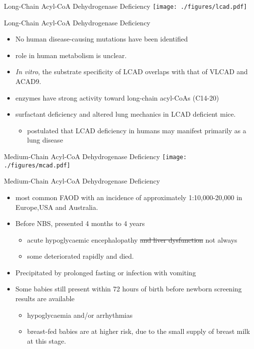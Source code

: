 \documentclass[presentation, smaller]{beamer}
\begin{document}
\begin{frame}[label={sec:orgheadline22}]{Long-Chain Acyl-CoA Dehydrogenase Deficiency}
\texttt{[image: ./figures/lcad.pdf]}
\end{frame}
\begin{frame}[label={sec:orgheadline23}]{Long-Chain Acyl-CoA Dehydrogenase Deficiency}
\begin{itemize}
\item No human disease-causing mutations have been identified
\item role  in  human  metabolism  is unclear.
\item \emph{In vitro}, the substrate specificity of LCAD overlaps with that of
VLCAD and ACAD9.
\item enzymes have strong activity toward long-chain acyl-CoAs (C14-20)
\item surfactant deficiency and altered lung mechanics in LCAD deficient
mice.
\begin{itemize}
\item postulated that LCAD deficiency in humans may manifest primarily
as a lung disease
\end{itemize}
\end{itemize}
\end{frame}
\begin{frame}[label={sec:orgheadline24}]{Medium-Chain Acyl-CoA Dehydrogenase Deficiency}
\texttt{[image: ./figures/mcad.pdf]}
\end{frame}
\begin{frame}[label={sec:orgheadline25}]{Medium-Chain Acyl-CoA Dehydrogenase Deficiency}
\begin{itemize}
\item most common FAOD with an incidence of approximately 1:10,000-20,000
in Europe,USA and Australia.
\item Before NBS, presented 4 months to 4 years
\begin{itemize}
\item acute hypoglycaemic encephalopathy \sout{and liver dysfunction} not always
\item some deteriorated rapidly and died.
\end{itemize}
\item Precipitated by prolonged fasting or infection with vomiting
\item Some babies still present within 72 hours of birth before
newborn screening results are available
\begin{itemize}
\item hypoglycaemia and/or arrhythmias
\item breast-fed babies are at higher risk, due to the small supply of
breast milk at this stage.
\end{itemize}
\end{itemize}
\end{frame}
\end{document}
